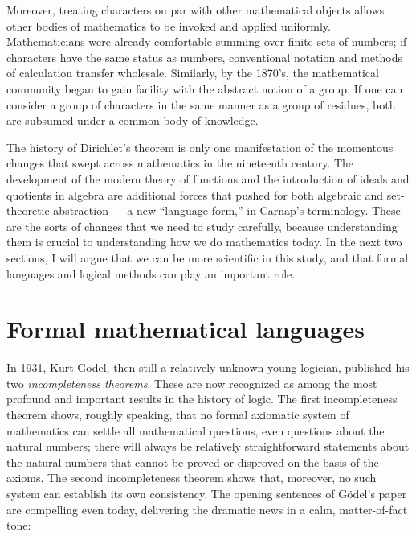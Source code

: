 \documentclass[12pt]{article}
\begin{document}
Moreover, treating characters on par with other mathematical objects allows other bodies of mathematics to be invoked and applied uniformly. Mathematicians were already comfortable summing over finite sets of numbers; if characters have the same status as numbers, conventional notation and methods of calculation transfer wholesale. Similarly, by the 1870's, the mathematical community began to gain facility with the abstract notion of a group. If one can consider a group of characters in the same manner as a group of residues, both are subsumed under a common body of knowledge.

The history of Dirichlet's theorem is only one manifestation of the momentous changes that swept across mathematics in the nineteenth century. The development of the modern theory of functions and the introduction of ideals and quotients in algebra are additional forces that pushed for both algebraic and set-theoretic abstraction --- a new ``language form,'' in Carnap's terminology. These are the sorts of changes that we need to study carefully, because understanding them is crucial to understanding how we do mathematics today. In the next two sections, I will argue that we can be more scientific in this study, and that formal languages and logical methods can play an important role.

\section{Formal mathematical languages}
\label{section:formal}

In 1931, Kurt G\"odel, then still a relatively unknown young logician, published his two \emph{incompleteness theorems}. These are now recognized as among the most profound and important results in the history of logic. The first incompleteness theorem shows, roughly speaking, that no formal axiomatic system of mathematics can settle all mathematical questions, even questions about the natural numbers; there will always be relatively straightforward statements about the natural numbers that cannot be proved or disproved on the basis of the axioms. The second incompleteness theorem shows that, moreover, no such system can establish its own consistency. The opening sentences of G\"odel's paper are compelling even today, delivering the dramatic news in a calm, matter-of-fact tone:
\end{document}
